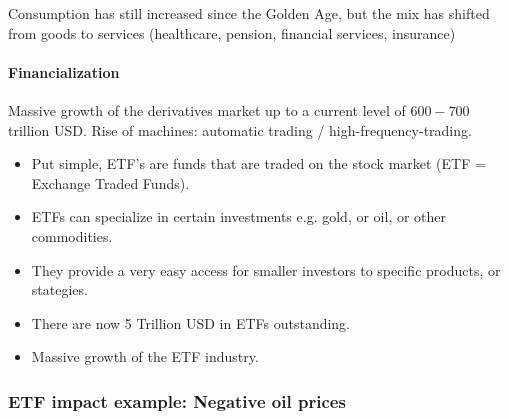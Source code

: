 Consumption has still increased since the Golden Age, but the mix has shifted
from goods to services (healthcare, pension, financial services, insurance)

\paragraph{Financialization}

Massive growth of the derivatives market up to a current level of $600-700$
trillion USD.
Rise of machines: automatic trading / high-frequency-trading.

\begin{itemize}
    \item Put simple, ETF's are funds that are traded on the stock market
        (ETF = Exchange Traded Funds).
    \item ETFs can specialize in certain investments e.g. gold, or oil,
        or other commodities.
    \item They provide a very easy access for smaller investors to specific
        products, or stategies.
    \item There are now 5 Trillion USD in ETFs outstanding.
    \item Massive growth of the ETF industry.
\end{itemize}


\subsubsection{ETF impact example: Negative oil prices}


